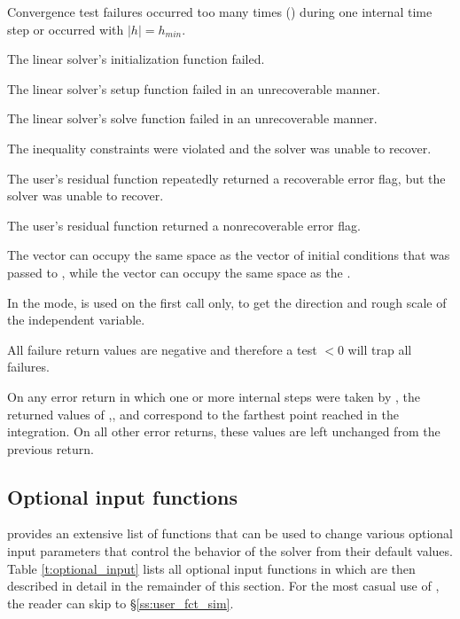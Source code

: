 {\begin{args}
  \item[\Id{IDA\_CONV\_FAIL}] 
    Convergence test failures occurred too many times () during 
    one internal time step or occurred with $|h| = h_{min}$.             
  \item[\Id{IDA\_LINIT\_FAIL}]
    The linear solver's initialization function failed.   
  \item[\Id{IDA\_LSETUP\_FAIL}] 
    The linear solver's setup function failed in an unrecoverable manner.
  \item[\Id{IDA\_LSOLVE\_FAIL}] 
    The linear solver's solve function failed in an unrecoverable manner.
  \item[\Id{IDA\_CONSTR\_FAIL}]
    The inequality constraints were violated and the solver was unable
    to recover.
  \item[\Id{IDA\_REP\_RES\_ERR}]
    The user's residual function repeatedly returned a recoverable error
    flag, but the solver was unable to recover.
  \item[\Id{IDA\_RES\_FAIL}]
    The user's residual function returned a nonrecoverable error flag.
  \end{args} 
}
{
  The vector  can occupy the same space as the  vector of 
  initial conditions that was passed to , while the
  vector  can occupy the same space as the .

  In the  mode,  is used on the first call only, 
  to get the direction and rough scale of the independent variable.

  All failure return values are negative and therefore a test  $< 0$
  will trap all  failures.

  On any error return in which one or more internal steps were taken by
  , the returned values of ,, and 
  correspond to the farthest point reached in the integration.
  On all other error returns, these values are left unchanged from the
  previous  return.
}


\subsection{Optional input functions}\label{ss:optional_input}

{\ida} provides an extensive list of functions that can be used to change
various optional input parameters that control the
behavior of the {\ida} solver from their default values. 
Table \ref{t:optional_input} lists all optional input functions in {\ida} which 
are then described in detail in the remainder of this section.
For the most casual use of {\ida}, the reader can skip to \S\ref{ss:user_fct_sim}.

